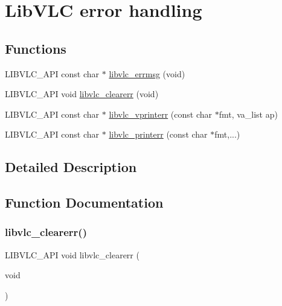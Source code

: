 \hypertarget{group__libvlc__error}{}\section{Lib\+V\+LC error handling}
\label{group__libvlc__error}
\subsection*{Functions}
\begin{DoxyCompactItemize}
\item 
L\+I\+B\+V\+L\+C\+\_\+\+A\+PI const char $\ast$ \hyperlink{group__libvlc__error_ga659961a8e857b904a6a9f249e550b2b1}{libvlc\+\_\+errmsg} (void)
\item 
L\+I\+B\+V\+L\+C\+\_\+\+A\+PI void \hyperlink{group__libvlc__error_ga8b96349dae8fbb24049edee86a8d3517}{libvlc\+\_\+clearerr} (void)
\item 
L\+I\+B\+V\+L\+C\+\_\+\+A\+PI const char $\ast$ \hyperlink{group__libvlc__error_ga9ad774cb360961ad4ebf4f4b4c548157}{libvlc\+\_\+vprinterr} (const char $\ast$fmt, va\+\_\+list ap)
\item 
L\+I\+B\+V\+L\+C\+\_\+\+A\+PI const char $\ast$ \hyperlink{group__libvlc__error_gaf3a4bb86d2cca57f0e22651f8d65696a}{libvlc\+\_\+printerr} (const char $\ast$fmt,...)
\end{DoxyCompactItemize}


\subsection{Detailed Description}


\subsection{Function Documentation}
\mbox{\label{group__libvlc__error_ga8b96349dae8fbb24049edee86a8d3517}} 
\subsubsection{\texorpdfstring{libvlc\+\_\+clearerr()}{libvlc\_clearerr()}}
{\footnotesize\ttfamily L\+I\+B\+V\+L\+C\+\_\+\+A\+PI void libvlc\+\_\+clearerr (\begin{DoxyParamCaption}\item[{void}]{ }\end{DoxyParamCaption})}

